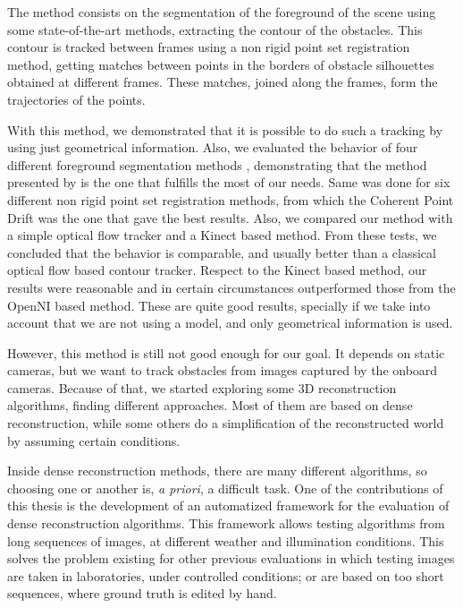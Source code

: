 The method consists on the segmentation of the foreground of the scene using some state-of-the-art methods, extracting the contour of the obstacles. This contour is tracked between frames using a non rigid point set registration method, getting matches between points in the borders of obstacle silhouettes obtained at different frames. These matches, joined along the frames, form the trajectories of the points.

With this method, we demonstrated that it is possible to do such a tracking by using just geometrical information. Also, we evaluated the behavior of four different foreground segmentation methods \citep{lopez2011stochastic, lopez2011foreground, guo2011hierarchical, reddy2012improved}, demonstrating that the method presented by \cite{reddy2012improved} is the one that fulfills the most of our needs. Same was done for six different non rigid point set registration methods, from which the Coherent Point Drift was the one that gave the best results. Also, we compared our method with a simple optical flow tracker and a Kinect based method. From these tests, we concluded that the behavior is comparable, and usually better than a classical optical flow based contour tracker. Respect to the Kinect based method, our results were reasonable and in certain circumstances outperformed those from the OpenNI based method. These are quite good results, specially if we take into account that we are not using a model, and only geometrical information is used.

However, this method is still not good enough for our goal. It depends on static cameras, but we want to track obstacles from images captured by the onboard cameras. Because of that, we started exploring some 3D reconstruction algorithms, finding different approaches. Most of them are based on dense reconstruction, while some others do a simplification of the reconstructed world by assuming certain conditions.

Inside dense reconstruction methods, there are many different algorithms, so choosing one or another is, \emph{a priori}, a difficult task. One of the contributions of this thesis is the development of an automatized framework for the evaluation of dense reconstruction algorithms. This framework allows testing algorithms from long sequences of images, at different weather and illumination conditions. This solves the problem existing for other previous evaluations in which testing images are taken in laboratories, under controlled conditions; or are based on too short sequences, where ground truth is edited by hand.

